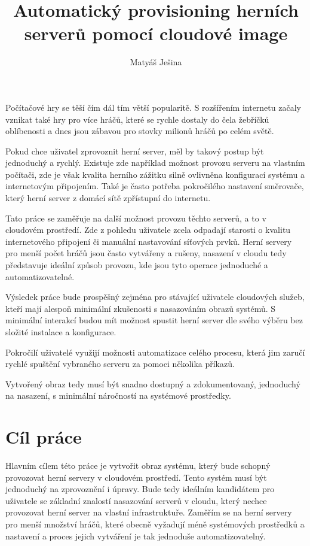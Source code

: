 \documentclass[thesis=B,czech]{FITthesis}[2019/12/23]
\title{Automatický provisioning herních serverů pomocí cloudové image}
\author{Matyáš Ješina} %
\begin{document}

\begin{introduction}

Počítačové hry se těší čím dál tím větší popularitě. S rozšířením internetu začaly vznikat také hry
pro více hráčů, které se rychle dostaly do čela žebříčků oblíbenosti a dnes jsou zábavou pro stovky milionů
hráčů po celém světě.

Pokud chce uživatel zprovoznit herní server, měl by takový postup být jednoduchý a rychlý.
Existuje zde například možnost provozu serveru na vlastním počítači, zde je však kvalita herního zážitku
silně ovlivněna konfigurací systému a internetovým připojením. Také je často potřeba pokročilého nastavení
směrovače, který herní server z domácí sítě zpřístupní do internetu.

Tato práce se zaměřuje na další možnost provozu těchto serverů, a to v cloudovém prostředí. Zde z pohledu uživatele 
zcela odpadají starosti o kvalitu internetového připojení či manuální nastavování síťových prvků. Herní servery
pro menší počet hráčů jsou často vytvářeny a rušeny, nasazení v cloudu tedy představuje ideální způsob provozu,
kde jsou tyto operace jednoduché a automatizovatelné.

Výsledek práce bude prospěšný zejména pro stávající uživatele cloudových služeb, kteří mají alespoň minimální
zkušenosti s nasazováním obrazů systémů. S minimální interakcí budou mít možnost spustit herní server dle svého
výběru bez složité instalace a konfigurace.

Pokročilí uživatelé využijí možnosti automatizace celého procesu, která jim zaručí rychlé spuštění vybraného serveru
za pomoci několika příkazů.

Vytvořený obraz tedy musí být snadno dostupný a zdokumentovaný, jednoduchý na nasazení, s minimální náročností 
na systémové prostředky.

\end{introduction}

\chapter{Cíl práce}

Hlavním cílem této práce je vytvořit obraz systému, který bude schopný provozovat herní servery v cloudovém prostředí.
Tento systém musí být jednoduchý na zprovoznění i úpravy. Bude tedy ideálním kandidátem pro uživatele se základní znalostí
nasazování serverů v cloudu, který nechce provozovat herní server na vlastní infrastruktuře.
Zaměřím se na herní servery pro menší množství hráčů, které obecně vyžadují méně systémových prostředků a nastavení
a proces jejich vytváření je tak jednoduše automatizovatelný.
\end{document}
